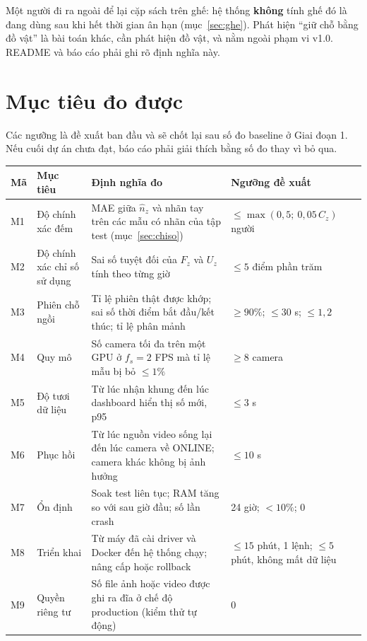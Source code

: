 \documentclass[10pt,a4paper,oneside,openany]{report}
\newcommand{\breakus}{\textunderscore\allowbreak}
\newcommand{\code}[1]{{\ttfamily\let\_\breakus #1}}
\newcommand{\tabhead}[1]{\textsf{\bfseries\color{ink}#1}}
\newenvironment{bang}{\par\small\rowcolors{2}{rowgray}{white}}{\par\vspace{0.3em}}
\begin{document}
\begin{quyetdinh}
Một người đi ra ngoài để lại cặp sách trên ghế: hệ thống \textbf{không} tính ghế đó là đang dùng sau khi hết thời gian ân hạn
(mục~\ref{sec:ghe}). Phát hiện \enquote{giữ chỗ bằng đồ vật} là bài toán khác, cần phát hiện đồ vật, và nằm ngoài phạm vi v1.0.
README và báo cáo phải ghi rõ định nghĩa này.
\end{quyetdinh}

\section{Mục tiêu đo được}\label{sec:muctieu}
Các ngưỡng là đề xuất ban đầu và sẽ chốt lại sau số đo baseline ở Giai đoạn 1. Nếu cuối dự án chưa đạt, báo cáo phải giải thích
bằng số đo thay vì bỏ qua.

\begin{bang}
\begin{xltabular}{\linewidth}{L{9mm}L{34mm}Y L{34mm}}
\toprule
\tabhead{Mã} & \tabhead{Mục tiêu} & \tabhead{Định nghĩa đo} & \tabhead{Ngưỡng đề xuất} \\
\midrule
\endhead
M1 & Độ chính xác đếm & MAE giữa $\hat n_z$ và nhãn tay trên các mẫu có nhãn của tập test (mục~\ref{sec:chiso}) & $\le \max(0{,}5;\ 0{,}05\,C_z)$ người \\
M2 & Độ chính xác chỉ số sử dụng & Sai số tuyệt đối của $F_z$ và $U_z$ tính theo từng giờ & $\le 5$ điểm phần trăm \\
M3 & Phiên chỗ ngồi & Tỉ lệ phiên thật được khớp; sai số thời điểm bắt đầu/kết thúc; tỉ lệ phân mảnh & $\ge 90\%$; $\le 30$ s; $\le 1{,}2$ \\
M4 & Quy mô & Số camera tối đa trên một GPU ở $f_s = 2$ FPS mà tỉ lệ mẫu bị bỏ $\le 1\%$ & $\ge 8$ camera \\
M5 & Độ tươi dữ liệu & Từ lúc nhận khung đến lúc dashboard hiển thị số mới, p95 & $\le 3$ s \\
M6 & Phục hồi & Từ lúc nguồn video sống lại đến lúc camera về \code{ONLINE}; camera khác không bị ảnh hưởng & $\le 10$ s \\
M7 & Ổn định & Soak test liên tục; RAM tăng so với sau giờ đầu; số lần crash & 24 giờ; $< 10\%$; 0 \\
M8 & Triển khai & Từ máy đã cài driver và Docker đến hệ thống chạy; nâng cấp hoặc rollback & $\le 15$ phút, 1 lệnh; $\le 5$ phút, không mất dữ liệu \\
M9 & Quyền riêng tư & Số file ảnh hoặc video được ghi ra đĩa ở chế độ production (kiểm thử tự động) & 0 \\
\bottomrule
\end{xltabular}
\end{bang}
\end{document}

